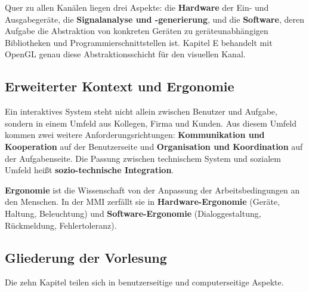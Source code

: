 \documentclass[12pt, a4paper]{article}
\begin{document}
Quer zu allen Kanälen liegen drei Aspekte: die \textbf{Hardware} der Ein- und
Ausgabegeräte, die \textbf{Signalanalyse und -generierung}, und die \textbf{Software},
deren Aufgabe die Abstraktion von konkreten Geräten zu geräteunabhängigen Bibliotheken
und Programmierschnittstellen ist. Kapitel E behandelt mit OpenGL genau diese
Abstraktionsschicht für den visuellen Kanal.

\subsection{Erweiterter Kontext und Ergonomie}

Ein interaktives System steht nicht allein zwischen Benutzer und Aufgabe, sondern in
einem Umfeld aus Kollegen, Firma und Kunden. Aus diesem Umfeld kommen zwei weitere
Anforderungsrichtungen: \textbf{Kommunikation und Kooperation} auf der Benutzerseite
und \textbf{Organisation und Koordination} auf der Aufgabenseite. Die Passung zwischen
technischem System und sozialem Umfeld heißt \textbf{sozio-technische Integration}.

\begin{definitionbox}
\textbf{Ergonomie} ist die Wissenschaft von der Anpassung der Arbeitsbedingungen an den
Menschen. In der MMI zerfällt sie in \textbf{Hardware-Ergonomie} (Geräte, Haltung,
Beleuchtung) und \textbf{Software-Ergonomie} (Dialoggestaltung, Rückmeldung,
Fehlertoleranz).
\end{definitionbox}

\subsection{Gliederung der Vorlesung}

Die zehn Kapitel teilen sich in benutzerseitige und computerseitige Aspekte.
\end{document}
